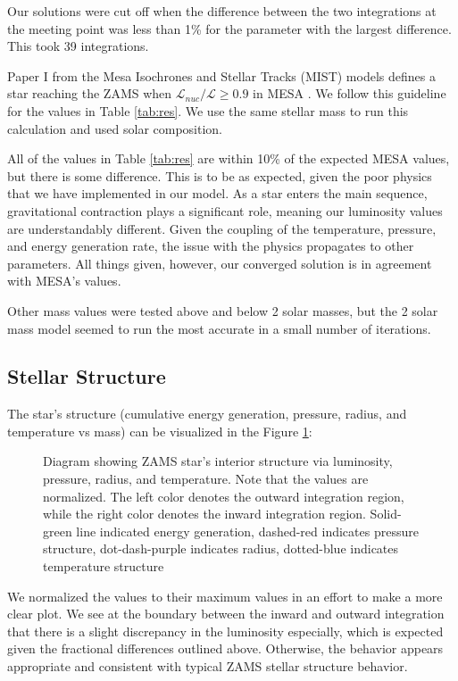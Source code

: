 \documentclass[twocolumn]{aastex631}
\begin{document}
Our solutions were cut off when the difference between the two integrations at the meeting point was less than 1\% for the parameter with the largest difference. This took 39 integrations.

Paper I from the Mesa Isochrones and Stellar Tracks (MIST) models defines a star reaching the ZAMS when $\mathcal{L}_{nuc}/\mathcal{L} \geq 0.9$ in MESA \citep{mist}. We follow this guideline for the values in Table \ref{tab:res}. We use the same stellar mass to run this calculation and used solar composition.


All of the values in Table \ref{tab:res} are within 10\% of the expected MESA values, but there is some difference. This is to be as expected, given the poor physics that we have implemented in our model. As a star enters the main sequence, gravitational contraction plays a significant role, meaning our luminosity values are understandably different. Given the coupling of the temperature, pressure, and energy generation rate, the issue with the physics propagates to other parameters. All things given, however, our converged solution is in agreement with MESA's values.

Other mass values were tested above and below 2 solar masses, but the 2 solar mass model seemed to run the most accurate in a small number of iterations.

\subsection{Stellar Structure}

The star's structure (cumulative energy generation, pressure, radius, and temperature vs mass) can be visualized in the Figure \ref{fig:tot}: 

\begin{figure}[ht!]
	\label{fig:tot}
	\caption{Diagram showing ZAMS star's interior structure via luminosity, pressure, radius, and temperature. Note that the values are normalized. The left color denotes the outward integration region, while the right color denotes the inward integration region. Solid-green line indicated energy generation, dashed-red indicates pressure structure, dot-dash-purple indicates radius, dotted-blue indicates temperature structure}
\end{figure}

We normalized the values to their maximum values in an effort to make a more clear plot. We see at the boundary between the inward and outward integration that there is a slight discrepancy in the luminosity especially, which is expected given the fractional differences outlined above. Otherwise, the behavior appears appropriate and consistent with typical ZAMS stellar structure behavior.
\end{document}
